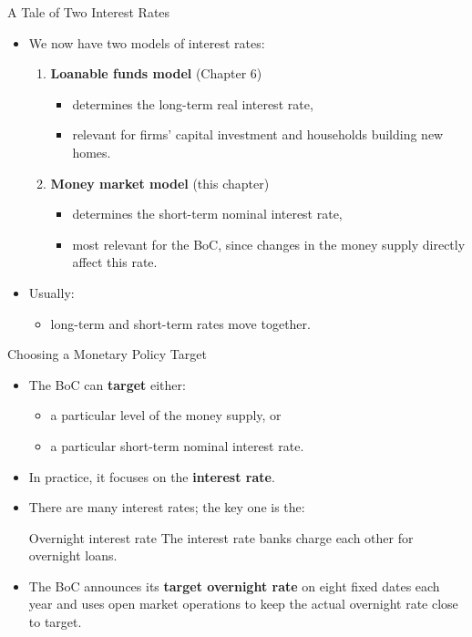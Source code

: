 \documentclass[aspectratio=169]{beamer}
\begin{document}
\begin{frame}{A Tale of Two Interest Rates}
\transfade
\begin{itemize}[<+->]
  \item We now have two models of interest rates:
  \begin{enumerate}[<+->]
    \item \textbf{Loanable funds model} (Chapter 6)
      \begin{itemize}[<+->]
        \item determines the \alert{long-term real} interest rate,
        \item relevant for firms’ capital investment and households building new homes.
      \end{itemize}
    \item \textbf{Money market model} (this chapter)
      \begin{itemize}[<+->]
        \item determines the \alert{short-term nominal} interest rate,
        \item most relevant for the BoC, since changes in the money supply directly affect this rate.
      \end{itemize}
  \end{enumerate}
  \item Usually:
  \begin{itemize}[<+->]
    \item long-term and short-term rates move together.
  \end{itemize}
\end{itemize}
\end{frame}

\begin{frame}{Choosing a Monetary Policy Target}
\transfade
\begin{itemize}[<+->]
  \item The BoC can \textbf{target} either:
  \begin{itemize}[<+->]
    \item a particular level of the money supply, or
    \item a particular short-term nominal interest rate.
  \end{itemize}
  \item In practice, it focuses on the \textbf{interest rate}.
  \item There are many interest rates; the key one is the:
  \begin{block}{Overnight interest rate}
    The interest rate banks charge each other for overnight loans.
  \end{block}
  \item The BoC announces its \textbf{target overnight rate} on eight fixed dates each year and uses open market operations to keep the actual overnight rate close to target.
\end{itemize}
\end{frame}
\end{document}
